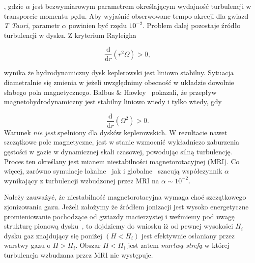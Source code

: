 , gdzie $\alpha$ jest bezwymiarowym parametrem określającym wydajność
turbulencji w transporcie momentu pędu. Aby wyjaśnić obserwowane tempo akrecji
dla gwiazd \emph{T Tauri}, parametr $\alpha$ powinien być rzędu $10^{-2}$.
Problem dalej pozostaje źródło turbulencji w dysku. Z kryterium
Rayleigha

\begin{equation}
   \frac{\mathrm{d}}{\mathrm{d}r}\left(r^2\Omega\right) > 0,
\end{equation}

wynika że hydrodynamiczny dysk keplerowski jest liniowo stabilny. Sytuacja
diametralnie się zmienia w jeżeli uwzględnimy obecność w układzie dowolnie
słabego pola magnetycznego. Balbus \& Hawley~\citep{BH91} pokazali, że przepływ
magnetohydrodynamiczny jest stabilny liniowo wtedy i tylko wtedy, gdy

\begin{equation}\label{eq:mri}
   \frac{\mathrm{d}}{\mathrm{d}r}\left(\Omega^2\right) > 0.
\end{equation}
Warunek  \emph{nie jest} spełniony dla dysków keplerowskich. W
rezultacie nawet szczątkowe pole magnetyczne, jest w stanie wzmocnić wykładniczo
zaburzenia gęstości w gazie w dynamicznej skali czasowej, powodując silną
turbulencję. Proces ten określany jest mianem niestabilności magnetorotacyjnej
(MRI). Co więcej, zarówno symulacje lokalne~\cite{Davis_Stone_Pessah_2010} jak
i globalne~\cite{Flock} szacują współczynnik $\alpha$ wynikający z turbulencji
wzbudzonej przez MRI na $\alpha\sim 10^{-2}$.
\par Należy zauważyć, że niestabilność magnetorotacyjna wymaga choć szczątkowego
zjonizowania gazu. Jeżeli założymy że źródłem jonizacji jest wysoko energetyczne
promieniowanie pochodzące od gwiazdy macierzystej i weźmiemy pod uwagę strukturę
pionową dysku~, to dojdziemy do wniosku iż od pewnej wysokości
$H_i$ dysku gaz znajdujący się poniżej $(H < H_i)$ jest efektywnie osłaniany
przez warstwy gazu o $H > H_i$. Obszar $H < H_i$ jest zatem \emph{martwą strefą}
w której turbulencja wzbudzana przez MRI nie występuje.

